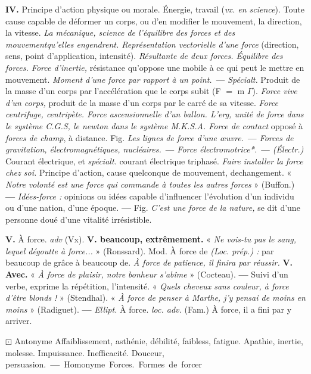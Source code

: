 {\bf IV.} Principe d'action physique ou morale.  Énergie, travail ({\it vx. en science}).  Toute cause capable de déformer un corps, ou d'en modifier le mouvement, la direction, la vitesse. {\it La mécanique, science de l'équilibre des forces et des mouvementqu'elles engendrent. Représentation vectorielle d'une force} (direction, sens, point d'application, intensité). {\it Résultante de deux forces. Équilibre des forces. Force d'inertie,} résistance qu'oppose une mobile à ce qui peut le mettre en mouvement. {\it Moment d'une force par rapport à un point. {\bf —} Spécialt.} Produit de la masse d'un corps par l'accélération que le corps subit (F $=$ m $\Gamma$). {\it Force vive d'un corps,} produit de la masse d'un corps par le carré de sa vitesse. {\it Force centrifuge, centripète. Force ascensionnelle d'un ballon. L'erg, unité de force dans le système C.G.S, le newton dans le système M.K.S.A. Force de contact} opposé à {\it forces de champ}, à distance.  Fig. {\it Les lignes de force d'une œuvre. {\bf —} Forces de gravitation, électromagnétiques, nucléaires. {\bf —} Force électromotrice*. {\bf —} (Électr.)} Courant électrique, et {\it spécialt.} courant électrique triphasé. {\it Faire installer la force chez soi.}  Principe d'action, cause quelconque de mouvement, dechangement. « {\it Notre volonté est une force qui commande à toutes les autres forces} » ({\sc Buffon.}) {\bf —} {\it Idées-force :} opinions ou idées capable d'influencer l'évolution d'un individu ou d'une nation, d'une époque.  {\bf —} Fig. {\it C'est une force de la nature,} se dit d'une personne doué d'une vitalité irrésistible.

{\bf V.} {\sc À force.} {\it adv} (Vx). {\bf V. beaucoup, extrêmement.} « {\it Ne vois-tu pas le sang, lequel dégoutte à force...} » ({\sc Ronssard}). \lb Mod. {\sc À force de} {\it (Loc. prép.) :} par beaucoup de grâce à beaucoup de. {\it À force de patience, il finira par réussir.} {\bf V. Avec.} « {\it À force de plaisir, notre bonheur s'abîme} » ({\sc Cocteau}). {\bf —} Suivi d'un verbe, exprime la répétition, l'intensité. « {\it Quels cheveux sans couleur, à force d'être blonds !} » ({\sc Stendhal}). « {\it À force de penser à Marthe, j'y pensai de moins en moins} » ({\sc Radiguet}). {\bf —} {\it Ellipt.} {\sc À force.} {\it loc. adv.} (Fam.) À force, il a fini par y arriver.

$\boxdot$ {\sc Antonyme} \si{Affaiblissement, asthénie, débilité, faibless, fatigue. Apathie, inertie, molesse. Impuissance. Inefficacité. Douceur, persuasion.} {\bf —} {\sc Homonyme} \si{Forces.} Formes de forcer

